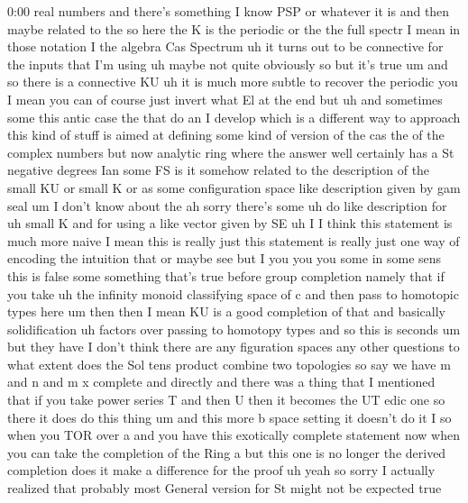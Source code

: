 \begin{unfinished}{0:00}
real
numbers  and  there's  something  I  know  PSP
or  whatever  it  is  and  then  maybe  related
to
the  so  here  the  K  is  the  periodic  or  the
the  full  spectr  I  mean  in  those  notation
I  the  algebra  Cas  Spectrum  uh  it  turns
out  to  be  connective  for  the  inputs  that
I'm  using  uh  maybe  not  quite  obviously
so  but  it's  true  um  and  so  there  is  a
connective
KU  uh  it  is  much  more  subtle  to  recover
the  periodic  you  I  mean  you  can  of
course  just  invert  what  El  at  the  end
but
uh  and  sometimes  some  this  antic  case
the  that  do  an  I  develop  which  is  a
different  way  to  approach  this  kind  of
stuff  is  aimed  at  defining  some  kind  of
version  of  the  cas  the  of  the  complex
numbers  but  now  analytic  ring  where  the
answer  well  certainly  has  a  St  negative
degrees
Ian  some  FS  is  it  somehow  related  to  the
description  of  the  small  KU  or  small  K
or  as  some  configuration  space  like
description  given  by  gam
seal  um  I  don't  know  about  the  ah
sorry  there's  some  uh  do  like
description  for  uh  small  K  and  for  using
a  like
vector  given  by
SE
uh  I  I  think  this  statement  is  much  more
naive  I  mean  this  is  really  just  this
statement  is  really  just  one  way  of
encoding  the  intuition  that  or  maybe  see
but  I  you  you  you  some  in  some  sens  this
is  false  some  something  that's  true
before  group  completion  namely  that  if
you  take
uh  the  infinity  monoid  classifying  space
of  c  and  then  pass  to  homotopic  types
here
um
then  then  I  mean  KU  is  a  good  completion
of  that  and  basically
solidification  uh  factors  over  passing
to  homotopy  types  and  so  this  is  seconds
um  but  they  have  I  don't  think  there  are
any  figuration
spaces  any  other
questions  to  what  extent  does  the  Sol
tens  product  combine  two  topologies  so
say  we  have  m  and  n  and  m  x  complete  and
directly  and  there  was  a  thing  that  I
mentioned  that  if  you  take  power  series
T  and  then  U  then  it  becomes  the  UT  edic
one  so  there  it  does  do  this  thing
um  and  this  more  b  space  setting  it
doesn't  do  it
I  so  when  you  TOR  over  a  and  you  have
this  exotically  complete  statement
now  when  you  can  take  the  completion  of
the  Ring  a  but  this  one  is  no
longer  the  derived  completion  does  it
make  a  difference  for  the
proof
uh  yeah  so  sorry  I  actually  realized
that
probably  most  General  version  for  St
might  not  be  expected  true

\end{unfinished}
